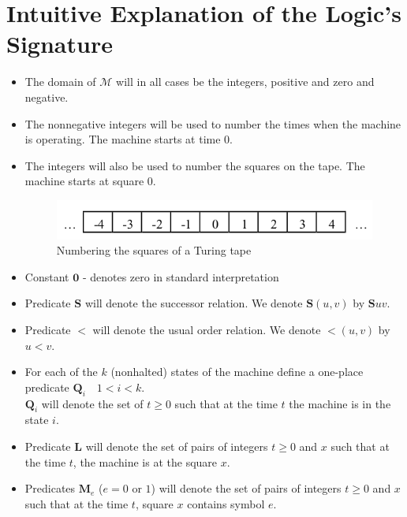 \documentclass[
11pt,notheorems,hyperref={pdfauthor=whatever}
]{beamer}
\begin{document}
\section{Intuitive Explanation of the Logic's Signature}
\begin{frame}
\begin{itemize}
    \item The domain of $\mathcal{M}$ will in all cases be the integers, positive and zero and negative.
    \item The nonnegative integers will be used to number the times when the machine is operating. The machine starts at time 0.
    \item The integers will also be used to number the squares on the tape. The machine starts at square 0.
    \begin{figure}
        \centering
        \includegraphics[scale=0.5]{images/01_tape.png}
        \caption{Numbering the squares of a Turing tape}
        \label{fig:turing_tape}
    \end{figure}
    \item Constant $\pmb{0}$ - denotes zero in standard interpretation
    \item Predicate $\pmb{S}$ will denote the successor relation. We denote $\pmb{S}(u,v)$ by $\pmb{S}uv$.
    \item Predicate $\pmb{<}$ will denote the usual order relation. We denote $\pmb{<}(u,v)$ by $u \pmb{<}v$.
    \item For each of the $k$ (nonhalted) states of the machine define a one-place predicate $\pmb{Q}_i\quad 1<i<k$.\\
    $\pmb{Q}_i$ will denote the set of $t\ge 0$ such that at the time $t$ the machine is in the state $i$.
    \item Predicate $\pmb{L}$ will denote the set of pairs of integers $t\ge 0$ and $x$ such that at the time $t$, the machine is at the square $x$.
    \item Predicates $\pmb{M}_e$ ($e=0$ or $1$) will denote the set of pairs of integers $t\ge 0$ and $x$ such that at the time $t$, square $x$ contains symbol $e$.
\end{itemize}
\end{frame}
\end{document}
